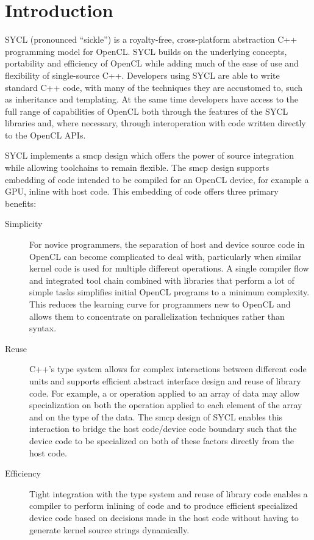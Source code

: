 
\chapter{Introduction}

SYCL (pronounced ``sickle'') is a
royalty-free, cross-platform abstraction C++ programming model for
OpenCL. SYCL builds on the underlying concepts, portability and
efficiency of OpenCL while adding much of the ease of use and
flexibility of single-source C++.
Developers using SYCL are able to write standard
C++ code, with many of the techniques they are accustomed to, such as
inheritance and templating. At the same time developers have access to
the full range of capabilities of OpenCL both through the features of
the SYCL libraries and, where necessary, through interoperation with
code written directly to the OpenCL APIs.

SYCL implements a \gls{smcp}  design which offers the power of source
integration while allowing toolchains to remain flexible. The \gls{smcp}
design supports embedding of code intended to be compiled for an OpenCL device,
for example a GPU, inline with host code. This embedding of code offers three
primary benefits:
\begin{description}
\item[Simplicity]
  For novice programmers, the separation of host and device source code in
  OpenCL can become complicated to deal with, particularly when similar kernel
  code is used for multiple different operations. A single compiler flow and
  integrated tool chain combined with libraries that perform a lot of simple
  tasks simplifies initial OpenCL programs to a minimum complexity. This reduces
  the learning curve for programmers new to OpenCL and allows them to
  concentrate on parallelization techniques rather than syntax.
\item[Reuse]
  C++'s type system allows for complex interactions between different code units
  and supports efficient abstract interface design and reuse of library code.
  For example, a  or  operation applied to an
  array of data may allow specialization on both the operation applied to each
  element of the array and on the type of the data. The \gls{smcp} design of
  SYCL enables this interaction to bridge the host code/device code boundary
  such that the device code to be specialized on both of these factors directly
  from the host code.
\item[Efficiency]
  Tight integration with the type system and reuse of library code enables a
  compiler to perform inlining of code and to produce efficient specialized
  device code based on decisions made in the host code without having to
  generate kernel source strings dynamically.
\end{description}

